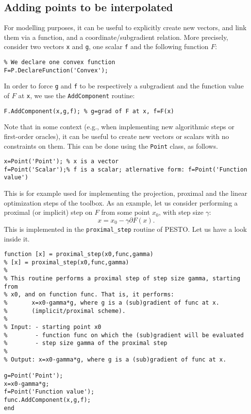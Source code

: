 \documentclass[11pt,a4paper]{article}
\begin{document}
					\subsection{Adding points to be interpolated}
					For modelling purposes, it can be useful to explicitly create new vectors, and link them via a function, and a coordinate/subgradient relation. More precisely, consider two vectors \verb?x? and \verb?g?, one scalar \verb?f? and the following function $F$:\\[-1cm]
					\begin{lstlisting}
% We declare one convex function
F=P.DeclareFunction('Convex');
					\end{lstlisting}
					In order to force \verb?g? and \verb?f? to be respectively a subgradient and the function value of $F$ at \verb?x?, we use the \verb?AddComponent? routine:\\[-1cm]
					\begin{lstlisting}
F.AddComponent(x,g,f); % g=grad of F at x, f=F(x)
					\end{lstlisting}
					Note that in some context (e.g., when implementing new algorithmic steps or first-order oracles), it can be useful to create new vectors or scalars with no constraints on them. This can be done using the \verb?Point? class, as follows.\\[-1cm]
					\begin{lstlisting}
x=Point('Point'); % x is a vector
f=Point('Scalar');% f is a scalar; atlernative form: f=Point('Function value')
					\end{lstlisting}
					This is for example used for implementing the projection, proximal and the linear optimization steps of the toolbox. As an example, let us consider performing a proximal (or implicit) step on $F$ from some point $x_0$, with step size $\gamma$:
					\[x=x_0-\gamma \partial F(x).\]
					This is implemented in the \verb?proximal_step? routine of PESTO. Let us have a look inside it.\\[-1cm]
					\begin{lstlisting}
function [x] = proximal_step(x0,func,gamma)
% [x] = proximal_step(x0,func,gamma)
%
% This routine performs a proximal step of step size gamma, starting from
% x0, and on function func. That is, it performs:
%       x=x0-gamma*g, where g is a (sub)gradient of func at x.
%       (implicit/proximal scheme).
%
% Input: - starting point x0
%        - function func on which the (sub)gradient will be evaluated
%        - step size gamma of the proximal step
%
% Output: x=x0-gamma*g, where g is a (sub)gradient of func at x.

g=Point('Point');
x=x0-gamma*g;
f=Point('Function value');
func.AddComponent(x,g,f);
end
					\end{lstlisting}
\end{document}
